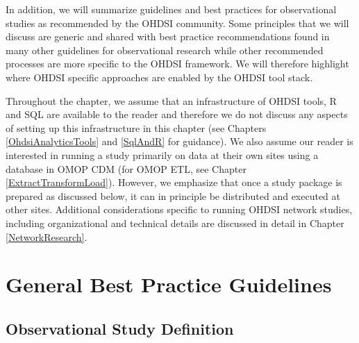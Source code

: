 \documentclass[11pt]{book}
\theoremstyle{definition}
\theoremstyle{definition}
\theoremstyle{definition}
\theoremstyle{remark}
\begin{document}
In addition, we will summarize guidelines and best practices for observational studies as recommended by the OHDSI community. Some principles that we will discuss are generic and shared with best practice recommendations found in many other guidelines for observational research while other recommended processes are more specific to the OHDSI framework. We will therefore highlight where OHDSI specific approaches are enabled by the OHDSI tool stack.

Throughout the chapter, we assume that an infrastructure of OHDSI tools, R and SQL are available to the reader and therefore we do not discuss any aspects of setting up this infrastructure in this chapter (see Chapters \ref{OhdsiAnalyticsTools} and \ref{SqlAndR} for guidance). We also assume our reader is interested in running a study primarily on data at their own sites using a database in OMOP CDM (for OMOP ETL, see Chapter \ref{ExtractTransformLoad}). However, we emphasize that once a study package is prepared as discussed below, it can in principle be distributed and executed at other sites. Additional considerations specific to running OHDSI network studies, including organizational and technical details are discussed in detail in Chapter \ref{NetworkResearch}.

\hypertarget{general-best-practice-guidelines}{%
\section{General Best Practice Guidelines}\label{general-best-practice-guidelines}}

\hypertarget{observational-study-definition}{%
\subsection{Observational Study Definition}\label{observational-study-definition}}
\end{document}
